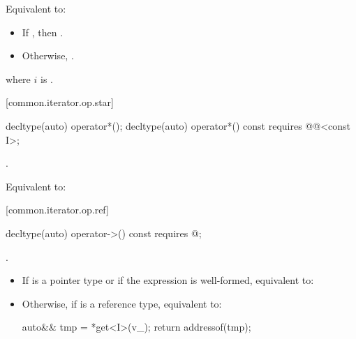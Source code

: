 \begin{addedblock}
\begin{itemdescr}
\pnum
\effects
Equivalent to:
\begin{itemize}
\item If , then
.

\item Otherwise, .
\end{itemize}
where $i$ is .

\pnum
\returns {}
\end{itemdescr}

[common.iterator.op.star]{}

%
%
\begin{itemdecl}
decltype(auto) operator*();
decltype(auto) operator*() const
  requires @@<const I>;
\end{itemdecl}

\begin{itemdescr}
\pnum
\expects {}.

\pnum
\effects Equivalent to: 
\end{itemdescr}

[common.iterator.op.ref]{}

%
%
\begin{itemdecl}
decltype(auto) operator->() const
  requires @\seebelownc@;
\end{itemdecl}

\begin{itemdescr}
\pnum
\expects {}.

\pnum
\effects
\begin{itemize}
\item
If  is a pointer type or if the expression
 is
well-formed, equivalent to: 

\item
Otherwise, if  is a reference type, equivalent to:
\begin{codeblock}
auto&& tmp = *get<I>(v_);
return addressof(tmp);
\end{codeblock}


\end{itemize}
\end{itemdescr}
\end{addedblock}
